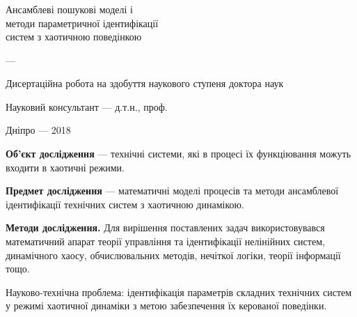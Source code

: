 \documentclass[14pt,handout,utf8]{beamer}
\author{\dissauthorUa}
\title[~]{\booknameUa}
\begin{document}
\begin{frame}
  \frametitle{}
  \begin{center}
    {\Large Ансамблеві пошукові моделі і \\ методи параметричної ідентифікації \\ систем з хаотичною поведінкою}

    \vfill

    {\dissSpecId --- \dissSpecUa}

    \vfill

    {\large \dissauthorMain}

    \vfill

    {Дисертаційна робота на здобуття наукового ступеня доктора наук}

    \vfill

    Науковий консультант --- д.т.н., проф. \superUa

    \vfill

    Дніпро --- 2018

  \end{center}

  \vfill

\textbf{Об'єкт дослідження } ---
технічні системи, які в процесі їх функціювання можуть
входити в хаотичні режими.

\smallskip
\textbf{Предмет дослідження } ---
математичні моделі процесів та методи
ансамблевої ідентифікації технічних систем з хаотичною динамікою.

\smallskip
\textbf{Методи дослідження.}
Для вирішення поставлених задач використовувався математичний апарат
теорії управління та ідентифікації нелінійних систем, динамічного хаосу,
обчислювальних методів, нечіткої логіки, теорії інформації тощо.

\smallskip
Науково-технічна проблема: ідентифікація параметрів складних технічних
систем у режимі хаотичної динаміки
з метою забезпечення їх керованої поведінки.
\end{frame}

\end{document}
